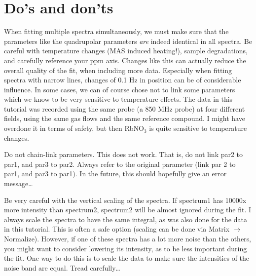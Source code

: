 \documentclass[11pt,a4paper]{article}
\begin{document}
\section{Do's and don'ts}
When fitting multiple spectra simultaneously, we must make sure that the parameters like the
quadrupolar parameters \textit{are} indeed identical in all spectra. Be careful with temperature
changes (MAS induced heating!), sample degradations, and carefully reference your ppm axis. Changes
like this can actually reduce the overall quality of the fit, when including more data. Especially
when fitting spectra with narrow lines, changes of 0.1 Hz in position can be of considerable
influence. In some cases, we can of course chose not to link some parameters which we know to be
very sensitive to temperature effects. The data in this tutorial was recorded using the same probe (a
850 MHz probe) at four different fields, using the same gas flows and the same reference compound. I
might have overdone it in terms of safety, but then RbNO$_3$ is quite sensitive to temperature changes.

Do not chain-link parameters. This does not work. That is, do not link par2 to par1, and par3 to
par2. Always refer to the original parameter (link par 2 to par1, and par3 to par1). In the future,
this should hopefully give an error message\ldots

Be very careful with the vertical scaling of the spectra. If spectrum1 has 10000x more intensity
than spectrum2, spectrum2 will be almost ignored during the fit. I always scale the spectra to have
the same integral, as was also done for the data in this tutorial. This is often a safe option
(scaling can be done via Matrix $\longrightarrow$ Normalize). However, if one of these spectra has a
lot more noise than the others, you might want to consider lowering its intensity, as to be less
important during the fit. One way to do this is to scale the data to make sure the intensities of
the noise band are equal. Tread carefully\ldots
\end{document}
